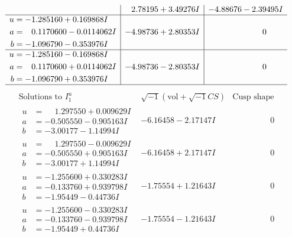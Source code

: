 \documentclass[1p]{elsarticle_modified}
\theoremstyle{definition}
\newcommand{\I}{\sqrt{-1}}
\begin{document}
$$\begin{array}{c|c|c}
 & \phantom{-}2.78195 + 3.49276 I & -4.88676 - 2.39495 I \\ \hline\begin{aligned}
u &= -1.285160 + 0.169868 I \\
a &= \phantom{-}0.1170600 - 0.0114062 I \\
b &= -1.096790 - 0.353976 I\end{aligned}
 & -4.98736 + 2.80353 I & \phantom{-0.000000 } 0 \\ \hline\begin{aligned}
u &= -1.285160 - 0.169868 I \\
a &= \phantom{-}0.1170600 + 0.0114062 I \\
b &= -1.096790 + 0.353976 I\end{aligned}
 & -4.98736 - 2.80353 I & \phantom{-0.000000 } 0\\
 \hline 
 \end{array}$$\newpage$$\begin{array}{c|c|c}  
\text{Solutions to }I^u_{1}& \I (\text{vol} + \sqrt{-1}CS) & \text{Cusp shape}\\
 \hline 
\begin{aligned}
u &= \phantom{-}1.297550 + 0.009629 I \\
a &= -0.505550 - 0.905163 I \\
b &= -3.00177 - 1.14994 I\end{aligned}
 & -6.16458 - 2.17147 I & \phantom{-0.000000 } 0 \\ \hline\begin{aligned}
u &= \phantom{-}1.297550 - 0.009629 I \\
a &= -0.505550 + 0.905163 I \\
b &= -3.00177 + 1.14994 I\end{aligned}
 & -6.16458 + 2.17147 I & \phantom{-0.000000 } 0 \\ \hline\begin{aligned}
u &= -1.255600 + 0.330283 I \\
a &= -0.133760 + 0.939798 I \\
b &= -1.95449 - 0.44736 I\end{aligned}
 & -1.75554 + 1.21643 I & \phantom{-0.000000 } 0 \\ \hline\begin{aligned}
u &= -1.255600 - 0.330283 I \\
a &= -0.133760 - 0.939798 I \\
b &= -1.95449 + 0.44736 I\end{aligned}
 & -1.75554 - 1.21643 I & \phantom{-0.000000 } 0 \\ \hline\begin{aligned}

\end{aligned}
\end{array}$$
\end{document}
